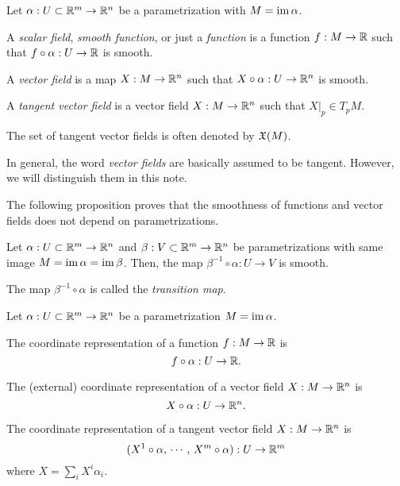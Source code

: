 \documentclass{../note}
\def\a{\alpha}
\begin{document}
\begin{defn}
Let $\a:U\subset\R^m\to\R^n$ be a parametrization with $M=\im\a$.
\begin{parts}
\item A \emph{scalar field}, \emph{smooth function}, or just a \emph{function} is a function $f:M\to\mathbb{R}$ such that $f\circ\a:U\to\R$ is smooth.
\item A \emph{vector field} is a map $X:M\to\mathbb{R}^n$ such that $X\circ\a:U\to\R^n$ is smooth.
\item A \emph{tangent vector field} is a vector field $X:M\to\mathbb{R}^n$ such that $X|_p\in T_pM$.
\end{parts}
The set of tangent vector fields is often denoted by $\mathfrak{X}(M)$.
\end{defn}
\begin{rmk}
In general, the word \emph{vector fields} are basically assumed to be tangent.
However, we will distinguish them in this note.
\end{rmk}

The following proposition proves that the smoothness of functions and vector fields does not depend on parametrizations.

\begin{prop}
Let $\a:U\subset\R^m\to\R^n$ and $\beta:V\subset\mathbb{R}^m\to\mathbb{R}^n$ be parametrizations with same image $M=\im\a=\im\beta$.
Then, the map $\beta^{-1}\circ\a:U\to V$ is smooth.
\end{prop}
\begin{pf}
\end{pf}
\begin{rmk}
The map $\beta^{-1}\circ\a$ is called the \emph{transition map}.
\end{rmk}

\begin{defn}
Let $\a:U\subset\R^m\to\R^n$ be a parametrization $M=\im\a$.
\begin{parts}
\item The coordinate representation of a function $f:M\to\mathbb{R}$ is
\[f\circ\a:U\to\R.\]
\item The (external) coordinate representation of a vector field $X:M\to\mathbb{R}^n$ is
\[X\circ\a:U\to\R^n.\]
\item The coordinate representation of a tangent vector field $X:M\to\mathbb{R}^n$ is
\[(X^1\circ\a,\,\cdots,\,X^m\circ\a):U\to\R^m\]
where $X=\sum_iX^i\a_i$.
\end{parts}
\end{defn}
\end{document}
